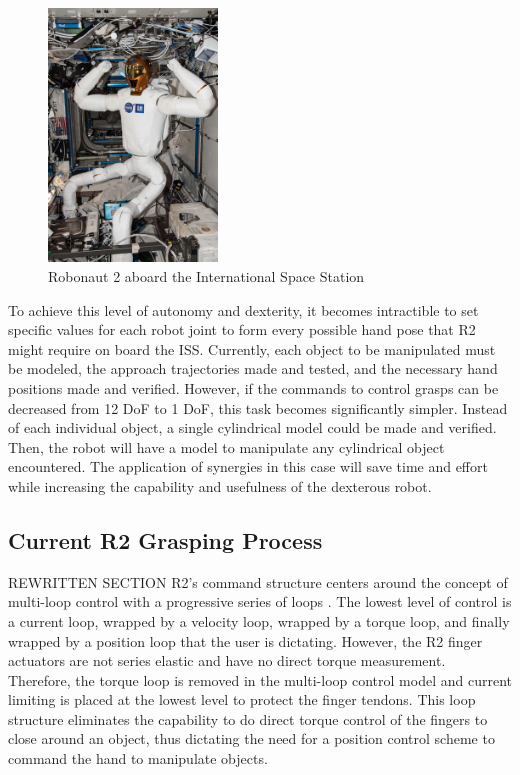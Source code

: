 \documentclass[runningheads,a4paper]{llncs}
\begin{document}
   \begin{figure}[t]
      \centering
      \includegraphics[width=0.4\textwidth]{r2_iss}
      \caption{Robonaut 2 aboard the International Space Station}
      \label{at_r2_iss}
   \end{figure}

To achieve this level of autonomy and dexterity, it becomes intractible to set specific values for each robot joint to form every possible hand pose that R2 might require on board the ISS. Currently, each object to be manipulated must be modeled, the approach trajectories made and tested, and the necessary hand positions made and verified. However, if the commands to control grasps can be decreased from 12 DoF to 1 DoF, this task becomes significantly simpler. Instead of each individual object, a single cylindrical model could be made and verified. Then, the robot will have a model to manipulate any cylindrical object encountered. The application of synergies in this case will save time and effort while increasing the capability and usefulness of the dexterous robot.   


\subsection{Current R2 Grasping Process}
REWRITTEN SECTION 
R2's command structure centers around the concept of multi-loop control with a progressive series of loops \cite{r2_control}. The lowest level of control is a current loop, wrapped by a velocity loop, wrapped by a torque loop, and finally wrapped by a position loop that the user is dictating. However, the R2 finger actuators are not series elastic and have no direct torque measurement. Therefore, the torque loop is removed in the multi-loop control model and current limiting is placed at the lowest level to protect the finger tendons. This loop structure eliminates the capability to do direct torque control of the fingers to close around an object, thus dictating the need for a position control scheme to command the hand to manipulate objects.
\end{document}
